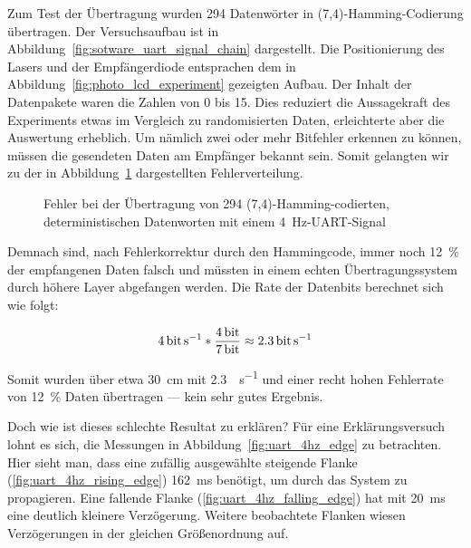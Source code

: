 \documentclass[12pt,a4paper]{article}
\begin{document}
Zum Test der Übertragung wurden 294 Datenwörter in (7,4)-Hamming-Codierung übertragen. Der Versuchsaufbau ist in Abbildung~\ref{fig:sotware_uart_signal_chain} dargestellt. Die Positionierung des Lasers und der Empfängerdiode entsprachen dem in Abbildung~\ref{fig:photo_lcd_experiment} gezeigten Aufbau. Der Inhalt der Datenpakete waren die Zahlen von 0 bis 15. Dies reduziert die Aussagekraft des Experiments etwas im Vergleich zu randomisierten Daten, erleichterte aber die Auswertung erheblich. Um nämlich zwei oder mehr Bitfehler erkennen zu können, müssen die gesendeten Daten am Empfänger bekannt sein. Somit gelangten wir zu der in Abbildung~\ref{fig:sotware_uart_errors} dargestellten Fehlerverteilung.

\begin{figure}[H]
  \centering
  \caption{Fehler bei der Übertragung von 294 (7,4)-Hamming-codierten, deterministischen Datenworten mit einem \SI{4}{\hertz}-UART-Signal}
  \label{fig:sotware_uart_errors}
\end{figure}

Demnach sind, nach Fehlerkorrektur durch den Hammingcode, immer noch \SI{12}{\percent} der empfangenen Daten falsch und müssten in einem echten Übertragungssystem durch höhere Layer abgefangen werden. Die Rate der Datenbits berechnet sich wie folgt:

\begin{equation}
 \SI{4}{\bit\per\second} * \frac{\SI{4}{\bit}}{\SI{7}{\bit}} \approx \SI{2.3}{\bit\per\second}
\end{equation}

Somit wurden über etwa \SI{30}{\centi\meter} mit \SI{2.3}{\bit\per\second} und einer recht hohen Fehlerrate von \SI{12}{\percent} Daten übertragen --- kein sehr gutes Ergebnis.

Doch wie ist dieses schlechte Resultat zu erklären? Für eine Erklärungsversuch lohnt es sich, die Messungen in Abbildung~\ref{fig:uart_4hz_edge} zu betrachten. Hier sieht man, dass eine zufällig ausgewählte steigende Flanke (\ref{fig:uart_4hz_rising_edge}) \SI{162}{\milli\second} benötigt, um durch das System zu propagieren. Eine fallende Flanke (\ref{fig:uart_4hz_falling_edge}) hat mit \SI{20}{\milli\second} eine deutlich kleinere Verzögerung. Weitere beobachtete Flanken wiesen Verzögerungen in der gleichen Größenordnung auf.
\end{document}
